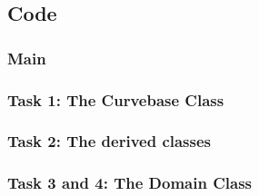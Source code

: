 \documentclass[a4paper,10pt]{article}
\begin{document}
\newpage
\subsection*{Code}
\subsubsection*{Main}

\subsubsection*{Task 1: The Curvebase Class}


\subsubsection*{Task 2: The derived classes}






\subsubsection*{Task 3 and 4: The Domain Class}


\end{document}
